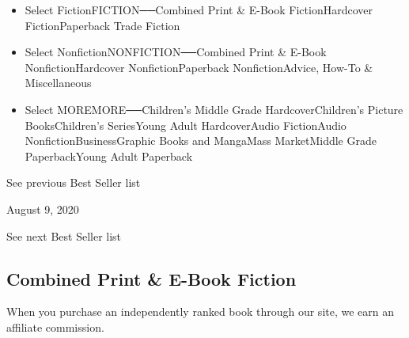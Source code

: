 \begin{itemize}
\tightlist
\item
  Select FictionFICTION──Combined Print \& E-Book FictionHardcover
  FictionPaperback Trade Fiction
\item
  Select NonfictionNONFICTION──Combined Print \& E-Book
  NonfictionHardcover NonfictionPaperback NonfictionAdvice, How-To \&
  Miscellaneous
\item
  Select MOREMORE──Children's Middle Grade HardcoverChildren's Picture
  BooksChildren's SeriesYoung Adult HardcoverAudio FictionAudio
  NonfictionBusinessGraphic Books and MangaMass MarketMiddle Grade
  PaperbackYoung Adult Paperback
\end{itemize}

\href{/books/best-sellers/2020/08/02/combined-print-and-e-book-fiction/}{}

See previous Best Seller list

August 9, 2020

See next Best Seller list

\hypertarget{combined-print--e-book-fiction}{%
\subsection{Combined Print \& E-Book
Fiction}\label{combined-print--e-book-fiction}}

When you purchase an independently ranked book through our site, we earn
an affiliate commission.


